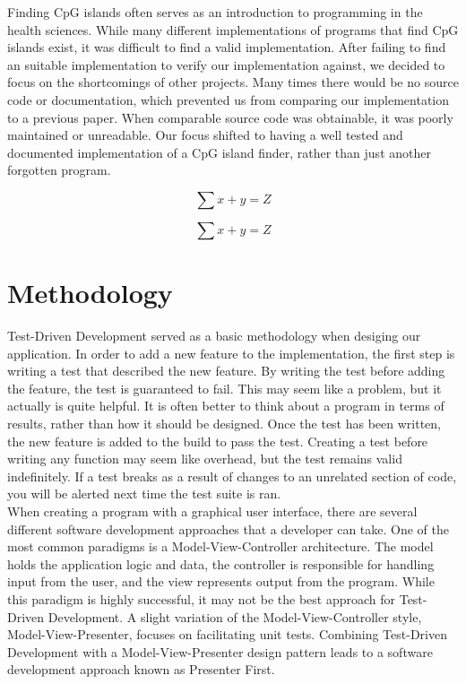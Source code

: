 \documentclass{bioinfo}
\begin{document}
Finding CpG islands often serves as an introduction to programming in the health sciences. While many different implementations of programs that find CpG islands exist, it was difficult to find a valid implementation. After failing to find an suitable implementation to verify our implementation against, we decided to focus on the shortcomings of other projects. Many times there would be no source code or documentation, which prevented us from comparing our implementation to a previous paper. When comparable source code was obtainable, it was poorly maintained or unreadable. Our focus shifted to having a well tested and documented implementation of a CpG island finder, rather than just another forgotten program.

\begin{equation}
\sum x+ y =Z\label{eq:01}
\end{equation}
    
\begin{equation}
\sum x+ y =Z\label{eq:02}
\end{equation}

\section{Methodology}
    
    Test-Driven Development served as a basic methodology when desiging our application. In order to add a new feature to the implementation, the first step is writing a test that described the new feature. By writing the test before adding the feature, the test is guaranteed to fail. This may seem like a problem, but it actually is quite helpful. It is often better to think about a program in terms of results, rather than how it should be designed. Once the test has been written, the new feature is added to the build to pass the test. Creating a test before writing any function may seem like overhead, but the test remains valid indefinitely. If a test breaks as a result of changes to an unrelated section of code, you will be alerted next time the test suite is ran.\\
    
    When creating a program with a graphical user interface, there are several different software development approaches that a developer can take. One of the most common paradigms is a Model-View-Controller architecture. The model holds the application logic and data, the controller is responsible for handling input from the user, and the view represents output from the program. While this paradigm is highly successful, it may not be the best approach for Test-Driven Development. A slight variation of the Model-View-Controller style, Model-View-Presenter, focuses on facilitating unit tests. Combining Test-Driven Development with a Model-View-Presenter design pattern leads to a software development approach known as Presenter First.\\
    
\end{document}
